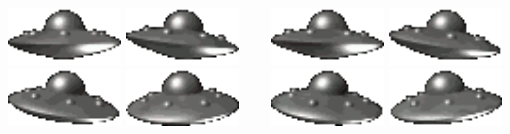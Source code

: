 \begin{frame}
    \begin{columns}
        \begin{column}{0.3\textwidth}
            \includegraphics[width=3cm]{images/out0000.png}
            \vfill
            \includegraphics[width=3cm]{images/out0003.png}
            \vfill
            \includegraphics[width=3cm]{images/out0006.png}
            \vfill
            \includegraphics[width=3cm]{images/out0009.png}
        \end{column}
        \begin{column}{0.3\textwidth}
            \includegraphics[width=3cm]{images/out0001.png}
            \vfill
            \includegraphics[width=3cm]{images/out0004.png}
            \vfill
            \includegraphics[width=3cm]{images/out0007.png}
            \vfill
            \includegraphics[width=3cm]{images/out0010.png}
        \end{column}

\end{columns}
\end{frame}
